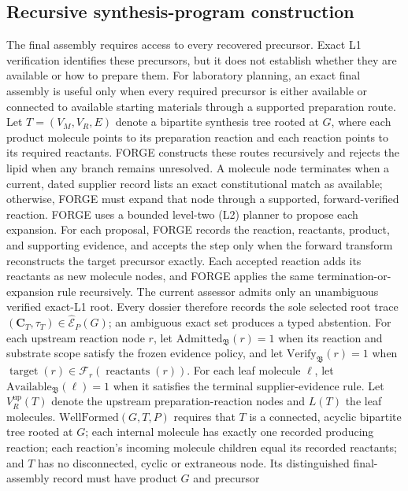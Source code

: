 \documentclass{article}
\begin{document}
\subsection{Recursive synthesis-program construction}

The final assembly requires access to every recovered precursor.
Exact L1 verification identifies these precursors, but it does not establish whether they are
available or how to prepare them.
For laboratory planning, an exact final assembly is useful only when every required precursor is
either available or connected to available starting materials through a supported preparation
route.
Let $T=(V_M,V_R,E)$ denote a bipartite synthesis tree rooted at $G$, where each product molecule
points to its preparation reaction and each reaction points to its required reactants.
FORGE constructs these routes recursively and rejects the lipid when any branch remains unresolved.
A molecule node terminates when a current, dated supplier record lists an exact constitutional match
as available; otherwise, FORGE must expand that node through a supported, forward-verified reaction.
FORGE uses a bounded level-two (L2) planner to propose each expansion.
For each proposal, FORGE records the reaction, reactants, product, and supporting evidence, and
accepts the step only when the forward transform reconstructs the target precursor exactly.
Each accepted reaction adds its reactants as new molecule nodes, and FORGE applies the same
termination-or-expansion rule recursively.
The current assessor admits only an unambiguous verified exact-L1 root. Every dossier therefore
records the sole selected root trace
$(\mathbf C_T,\tau_T)\in\widehat{\mathcal E}_P(G)$; an ambiguous exact set produces a typed
abstention. For each upstream reaction node $r$, let
$\mathrm{Admitted}_{\mathfrak B}(r)=1$ when its reaction and substrate scope satisfy the frozen
evidence policy, and let $\mathrm{Verify}_{\mathfrak B}(r)=1$ when
$\operatorname{target}(r)\in\mathcal F_r(\operatorname{reactants}(r))$.
For each leaf molecule $\ell$, let $\mathrm{Available}_{\mathfrak B}(\ell)=1$ when it satisfies the terminal
supplier-evidence rule.
Let $V_R^{\mathrm{up}}(T)$ denote the upstream preparation-reaction nodes and $L(T)$ the leaf
molecules. $\mathrm{WellFormed}(G,T,P)$ requires that $T$ is a connected, acyclic bipartite tree
rooted at $G$; each internal molecule has exactly one recorded producing reaction; each reaction's
incoming molecule children equal its recorded reactants; and $T$ has no disconnected, cyclic or
extraneous node. Its distinguished final-assembly record must have product $G$ and precursor
\end{document}

